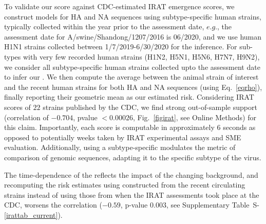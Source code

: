 \documentclass[onecolumn, compsoc,10pt]{IEEEtran}
\def\SUPPLEMENTARY{Supplementary\xspace}
\def\METHODS{Online Methods\xspace}
\begin{document}
To validate our score against CDC-estimated IRAT emergence scores, we construct \enet models for HA and NA sequences using subtype-specific human strains, typically collected within the  year prior to the assessment date, $e.g.$,  the  assessment date for A/swine/Shandong/1207/2016 is 06/2020, and  we  use human H1N1 strains collected  between 1/7/2019-6/30/2020 for the \enet inference. For sub-types with very few recorded human strains (H1N2, H5N1, H5N6, H7N7, H9N2), we consider all subtype-specific human strains collected upto the  assessment date  to infer our \enet. We then compute the average \qdist between the animal  strain of interest  and the recent human strains for both HA and NA sequences (using Eq.~\eqref{eqrho}),  finally reporting their geometric mean as our estimated risk. Considering IRAT scores of $22$ strains published by the CDC, we find strong out-of-sample support  (correlation of $-0.704$, pvalue $<0.00026$, Fig.~\ref{figirat}, see \METHODS) for this claim. Importantly, each \erisk score  is  computable in approximately $6$ seconds as opposed to potentially weeks taken by IRAT experimental assays and SME evaluation. Additionally,  using a  subtype-specific \enet modulates the  metric of comparison of genomic sequences, adapting it to the specific subtype of the virus.


The time-dependence of the \erisk reflects the impact of the changing background, and recomputing the risk estimates using  constructed from the recent circulating strains instead of using those from when the IRAT assessments took place at the  CDC,  worsens the correlation ($-0.59$, p-value $0.003$, see \SUPPLEMENTARY Table~S-\ref{irattab_current}).
\end{document}
